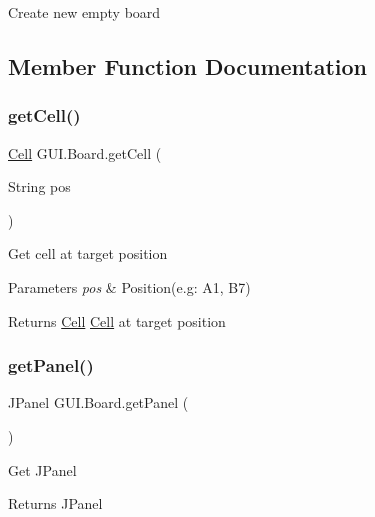 Create new empty board 

\subsection{Member Function Documentation}
\mbox{\label{class_g_u_i_1_1_board_a2eae485591977a602b2f1eb67fa1718e}} 
\subsubsection{\texorpdfstring{getCell()}{getCell()}}
{\footnotesize\ttfamily \mbox{\hyperlink{class_g_u_i_1_1_cell}{Cell}} G\+U\+I.\+Board.\+get\+Cell (\begin{DoxyParamCaption}\item[{String}]{pos }\end{DoxyParamCaption})\hspace{0.3cm}{\ttfamily [inline]}}

Get cell at target position


\begin{DoxyParams}{Parameters}
{\em pos} & Position(e.\+g\+: A1, B7) \\
\hline
\end{DoxyParams}
\begin{DoxyReturn}{Returns}
\mbox{\hyperlink{class_g_u_i_1_1_cell}{Cell}} \mbox{\hyperlink{class_g_u_i_1_1_cell}{Cell}} at target position 
\end{DoxyReturn}
\mbox{\label{class_g_u_i_1_1_board_a5687d06b1a3a957953d4b63ec2a69806}} 
\subsubsection{\texorpdfstring{getPanel()}{getPanel()}}
{\footnotesize\ttfamily J\+Panel G\+U\+I.\+Board.\+get\+Panel (\begin{DoxyParamCaption}{ }\end{DoxyParamCaption})\hspace{0.3cm}{\ttfamily [inline]}}

Get J\+Panel

\begin{DoxyReturn}{Returns}
J\+Panel 
\end{DoxyReturn}
\mbox{\label{class_g_u_i_1_1_board_a5c731ea8c55eb03fbe3957b6780d2d99}} 
